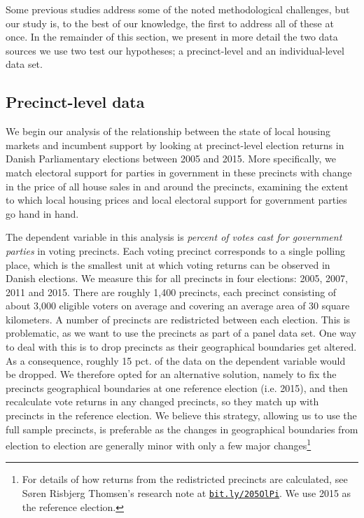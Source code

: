 \documentclass[12pt,a4paper]{article}
\begin{document}
	Some previous studies address some of the noted methodological challenges, but our study is, to the best of our knowledge, the first to address all of these at once. In the remainder of this section, we present in more detail the two data sources we use two test our hypotheses; a precinct-level and an individual-level data set.
	
	\subsection{Precinct-level data}\label{precinctlevel}
	We begin our analysis of the relationship between the state of local housing markets and incumbent support by looking at precinct-level election returns in Danish Parliamentary elections between 2005 and 2015. More specifically, we match electoral support for parties in government in these precincts with change in the price of all house sales in and around the precincts, examining the extent to which local housing prices and local electoral support for government parties go hand in hand.
	
	
	The dependent variable in this analysis is \textit{percent of votes cast for government parties} in voting precincts. Each voting precinct corresponds to a single polling place, which is the smallest unit at which voting returns can be observed in Danish elections. We measure this for all precincts in four elections:  2005, 2007, 2011 and 2015. There are roughly 1,400 precincts, each precinct consisting of about 3,000 eligible voters on average and covering an average area of 30 square kilometers. A number of precincts are redistricted between each election. This is problematic, as we want to use the precincts as part of a panel data set. One way to deal with this is to drop precincts as their geographical boundaries get altered. As a consequence, roughly 15 pct. of the data on the dependent variable would be dropped. We therefore opted for an alternative solution, namely to fix the precincts geographical boundaries at one reference election (i.e. 2015), and then recalculate vote returns in any changed precincts, so they match up with precincts in the reference election. We believe this strategy, allowing us to use the full sample precincts, is preferable as the changes in geographical boundaries from election to election are generally minor with only a few major changes\footnote{For details of how returns from the redistricted precincts are calculated, see Søren Risbjerg Thomsen's research note at \texttt{\href{http://bit.ly/205OlPi}{bit.ly/205OlPi}}.  We use 2015 as the reference election.}
	
\end{document}
